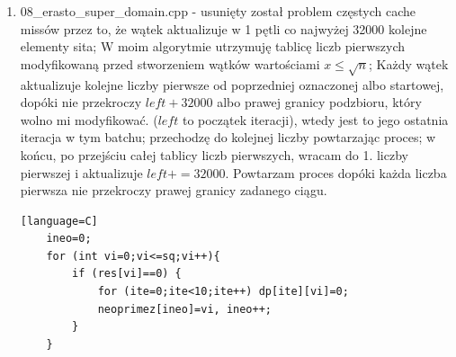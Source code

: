 \documentclass[12pt]{article}
\begin{document}
\begin {enumerate}
\begin{lstlisting}[style=mystyle, caption= Sito funkcyjne z dynamic schedulingiem][language=C]
		for (i=0;i<=sq;i++){
			if (res[i]==0){
				based_left=left-left%i+((left%i==0)?0:i);
				for (j=based_left;j<=right;j+=i) res[j]=1;
			}
		}
	}
	\end{lstlisting}
	Kod ten ma 3 zasadnicze różnice w porównaniu z kodem (3) w kontekście wspólbieżności:
	\begin{enumerate}
		\item Dyrektywa tworzy wątki, które podzielą się nieomal równomiernie pracą - ponieważ każdy wątek musi użyć każdej liczby pierwszej z części domkniętej sita do oznaczenia przedziału z części otwartej sita o wielkości (prawie) równej dla każdego wątku.
		\item False sharing zachodzi w szczególnym przypadku, gdy sprawdzam pod kątem pierwszości liczbę \(x\) - albo ją odnaczam jako złożoną, razem z nią ściągając do cache liczbę \(y\) w części otwartej używanej przez inny wątek, która może się zmieniać, ponieważ \(|x-y|<64\) (64 bajty to rozmiar linii pamięci, a rozmiar typu bool na systemie, na którym zaszło testowanie to 1 bajt). Może on jednak zajść nie więcej niż \((4+1)*64*log_2(n)\) razy, bo \(\sqrt[log_2(n)]{n}\le log_2(n)\), a liczba wątków to co najwyżej \(4\), dodatkowe \(+1\) wynika z wątku używającego podciągu obok tablicy z części domkniętej sita - jest to liczba o kilka rzędów wielkości mniejsza niż \(n\), zatem (co pokaże później VTune profiler) false sharing nie będzie prawie wcale wpływał na czas przetwarzania.
		\item Wątki będą modyfikowały współdzielone L2 i L3 cache - co za tym idzie, często będą zachodziły cache-missy, ponieważ L2 i L3 cache będą często zmieniały dane - w praktyce każdy wątek będzie modyfikował zupełnie inne części tablicy, które będą stale się zmieniać (inaczej niż np. w przypadku, w którym 1 wątek modyfikuje co 2. element tablicy), a nie zmieszczą się one w L1 cache (mogącej pomieścić 128KB danych nie będących instrukcjami).
	\end{enumerate}

	\item 08\_erasto\_super\_domain.cpp - usunięty został problem częstych cache missów przez to, że wątek aktualizuje w 1 pętli co najwyżej 32000 kolejne elementy sita; W moim algorytmie utrzymuję tablicę liczb pierwszych modyfikowaną przed stworzeniem wątków wartościami \(x\le \sqrt{n}\); Każdy wątek aktualizuje kolejne liczby pierwsze od poprzedniej oznaczonej albo startowej, dopóki nie przekroczy \(left+32000\) albo prawej granicy podzbioru, który wolno mi modyfikować. (\(left\) to początek iteracji), wtedy jest to jego ostatnia iteracja w tym batchu; przechodzę do kolejnej liczby powtarzając proces; w końcu, po przejściu całej tablicy liczb pierwszych, wracam do 1. liczby pierwszej i aktualizuje \(left+=32000\). Powtarzam proces dopóki każda liczba pierwsza nie przekroczy prawej granicy zadanego ciągu.
	\begin{lstlisting}[style=mystyle, caption= Sito funkcyjne z dynamic schedulingiem][language=C]
	ineo=0;
	for (int vi=0;vi<=sq;vi++){
		if (res[vi]==0) {
			for (ite=0;ite<10;ite++) dp[ite][vi]=0;
			neoprimez[ineo]=vi, ineo++;
		}
	}
	

\end{lstlisting}
\end{enumerate}
\end{document}
